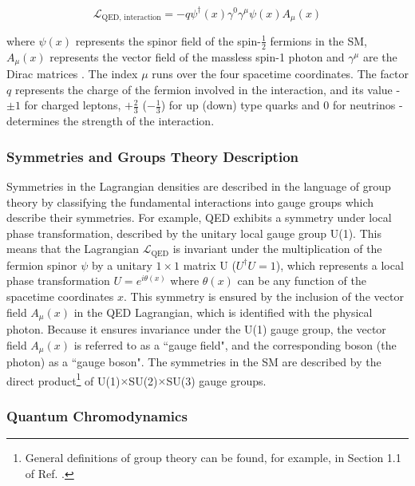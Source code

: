 \begin{equation}
\label{eq:qed_interaction}
\mathcal{L}_\text{QED, interaction} = -q\psi^\dagger(x)\gamma^0\gamma^\mu\psi(x) A_\mu(x)
\end{equation}

\noindent where \(\psi(x)\) represents the spinor field of the spin-\(\frac{1}{2}\) fermions in the SM, \(A_\mu(x)\) represents the vector field of the massless spin-1 photon and \(\gamma^\mu\) are the Dirac matrices \cite{Griffiths_2008}. The index \(\mu\) runs over the four spacetime coordinates. The factor \(q\) represents the charge of the fermion involved in the interaction, and its value - \(\pm1\) for charged leptons, \(+\frac{2}{3}\) (\(-\frac{1}{3}\)) for up (down) type quarks and 0 for neutrinos - determines the strength of the interaction. 

\subsubsection{Symmetries and Groups Theory Description}

Symmetries in the Lagrangian densities are described in the language of group theory by classifying the fundamental interactions into gauge groups which describe their symmetries. For example, QED exhibits a symmetry under local phase transformation, described by the unitary local gauge group U(1). This means that the Lagrangian \(\mathcal{L}_\text{QED}\) is invariant under the multiplication of the fermion spinor \(\psi\) by a unitary \(1\times1\) matrix U (\(U^\dagger U=1\)), which represents a local phase transformation \(U = e^{i\theta(x)}\) where \(\theta(x)\) can be any function of the spacetime coordinates \(x\). This symmetry is ensured by the inclusion of the vector field \(A_\mu(x)\) in the QED Lagrangian, which is identified with the physical photon. Because it ensures invariance under the U(1) gauge group, the vector field \(A_\mu(x)\) is referred to as a ``gauge field", and the corresponding boson (the photon) as a ``gauge boson". The symmetries in the SM are described by the direct product\footnote{General definitions of group theory can be found, for example, in Section 1.1 of Ref. \cite{costa2012symmetries}.} of U(1)\(\times\)SU(2)\(\times\)SU(3) gauge groups. 

\subsubsection{Quantum Chromodynamics}

